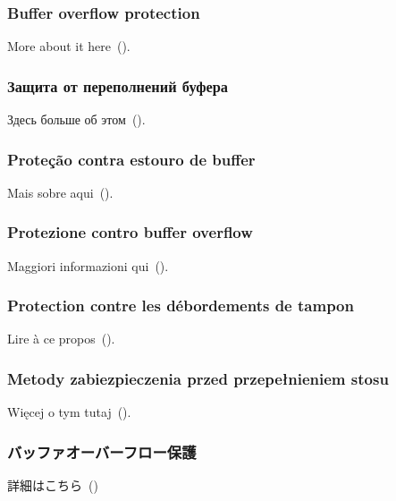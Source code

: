 \ifdefined\ENGLISH
\subsubsection{Buffer overflow protection}

More about it here~().
\fi

\ifdefined\RUSSIAN
\subsubsection{Защита от переполнений буфера}

Здесь больше об этом~().
\fi

\ifdefined\BRAZILIAN
\subsubsection{Proteção contra estouro de buffer}

Mais sobre aqui~().
\fi

\ifdefined\ITALIAN
\subsubsection{Protezione contro buffer overflow}

Maggiori informazioni qui~().
\fi

\ifdefined\FRENCH
\subsubsection{Protection contre les débordements de tampon}

Lire à ce propos~().
\fi


\ifdefined\POLISH
\subsubsection{Metody zabiezpieczenia przed przepełnieniem stosu}

Więcej o tym tutaj~().
\fi

\ifdefined\JAPANESE
\subsubsection{バッファオーバーフロー保護}

詳細はこちら~()
\fi
